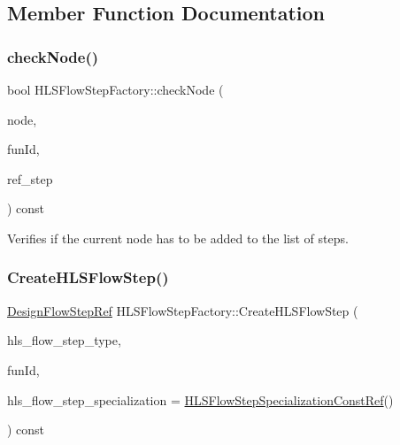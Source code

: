 \subsection{Member Function Documentation}
\mbox{\label{classHLSFlowStepFactory_a65dc11d6a2491bb44c1e10c38270cf91}} 
\subsubsection{\texorpdfstring{check\+Node()}{checkNode()}}
{\footnotesize\ttfamily bool H\+L\+S\+Flow\+Step\+Factory\+::check\+Node (\begin{DoxyParamCaption}\item[{const \hyperlink{classxml__element}{xml\+\_\+element} $\ast$}]{node,  }\item[{unsigned int}]{fun\+Id,  }\item[{const std\+::string \&}]{ref\+\_\+step }\end{DoxyParamCaption}) const\hspace{0.3cm}{\ttfamily [protected]}}



Verifies if the current node has to be added to the list of steps. 

\mbox{\label{classHLSFlowStepFactory_ae5460c506f214e7b874e267e18ca8531}} 
\subsubsection{\texorpdfstring{Create\+H\+L\+S\+Flow\+Step()}{CreateHLSFlowStep()}\hspace{0.1cm}{\footnotesize\ttfamily [1/3]}}
{\footnotesize\ttfamily \hyperlink{design__flow__step_8hpp_a9dd6b4474ddf52d41a78b1aaa12ae6c8}{Design\+Flow\+Step\+Ref} H\+L\+S\+Flow\+Step\+Factory\+::\+Create\+H\+L\+S\+Flow\+Step (\begin{DoxyParamCaption}\item[{const \hyperlink{hls__step_8hpp_ada16bc22905016180e26fc7e39537f8d}{H\+L\+S\+Flow\+Step\+\_\+\+Type}}]{hls\+\_\+flow\+\_\+step\+\_\+type,  }\item[{const unsigned int}]{fun\+Id,  }\item[{const \hyperlink{hls__step_8hpp_a5fdd2edf290c196531d21d68e13f0e74}{H\+L\+S\+Flow\+Step\+Specialization\+Const\+Ref}}]{hls\+\_\+flow\+\_\+step\+\_\+specialization = {\ttfamily \hyperlink{hls__step_8hpp_a5fdd2edf290c196531d21d68e13f0e74}{H\+L\+S\+Flow\+Step\+Specialization\+Const\+Ref}()} }\end{DoxyParamCaption}) const}



